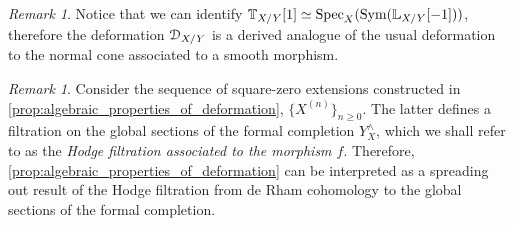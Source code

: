 \documentclass[10pt,a4paper,reqno]{amsart} %
\theoremstyle{plain}
\theoremstyle{definition}
\theoremstyle{remark}
\newtheorem{rem}[thm]{Remark}
\numberwithin{equation}{section}
\begin{document}
\begin{rem}
    Notice that we can identify $\mathbb T_{X/ Y}[1] \simeq \operatorname{Spec}_X(\operatorname{Sym}(\mathbb L_{X/ Y}[-1]))$, therefore the deformation $\mathcal D_{X/ Y}$ is a derived analogue
    of the usual deformation to the normal cone associated to a smooth morphism.
\end{rem}

\begin{rem}
    Consider the sequence of square-zero extensions constructed in \cref{prop:algebraic_properties_of_deformation}, $\{ X^{(n)} \}_{n \ge 0}$.
    The latter defines a filtration on the global sections of the formal completion $Y^\wedge_X$, which we shall
    refer to as the \emph{Hodge filtration associated to the morphism $f$}. Therefore, \cref{prop:algebraic_properties_of_deformation}
    can be interpreted as a spreading out result of the Hodge filtration
    from de Rham cohomology to the global sections of the formal completion.
\end{rem}
\end{document}
